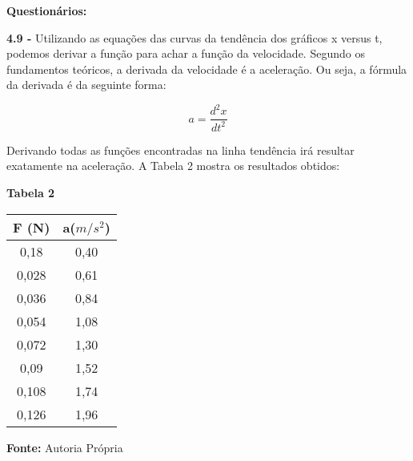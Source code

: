 \documentclass[article,12pt,oneside,a4paper,brazil]{abntex2}
\begin{document}
	\begin{flushleft}
		\textbf{Questionários: }
		
		\textbf{4.9 -} Utilizando as equações das curvas da tendência dos gráficos x versus t, podemos derivar a função para achar a função da velocidade. Segundo os fundamentos teóricos, a derivada da velocidade é a aceleração. Ou seja, a fórmula da derivada é da seguinte forma:	
		
		\begin{equation*}
			a = \dfrac{d^2x}{dt^2}
		\end{equation*}
		
		Derivando todas as funções encontradas na linha tendência irá resultar exatamente na
		aceleração. A Tabela 2 mostra os resultados obtidos:
		
		\begin{center}
			\begin{table}[h!]
				\centering
				\begin{adjustwidth}{0cm}{0cm}
					\begin{flushleft}
						\textbf{Tabela 2}
					\end{flushleft}
				\end{adjustwidth}
				
				\label{tab:intervalos-forca}
				\begin{tabular}{|c|c|}
					\hline
					\textbf{F (N)} & a($m/s^2$)\\ \hline
					0,18 & 0,40 \\ \hline
					0,028 & 0,61 \\ \hline
					0,036 & 0,84 \\ \hline
					0,054 & 1,08 \\ \hline
					0,072 & 1,30 \\ \hline
					0,09 & 1,52 \\ \hline
					0,108 & 1,74 \\ \hline
					0,126 & 1,96 \\ \hline
				\end{tabular}
				
				\begin{adjustwidth}{0cm}{0cm}
					\begin{flushleft}
						\textbf{Fonte: }Autoria Própria
					\end{flushleft}
				\end{adjustwidth}
			\end{table}
		\end{center}
		

\end{flushleft}
\end{document}
